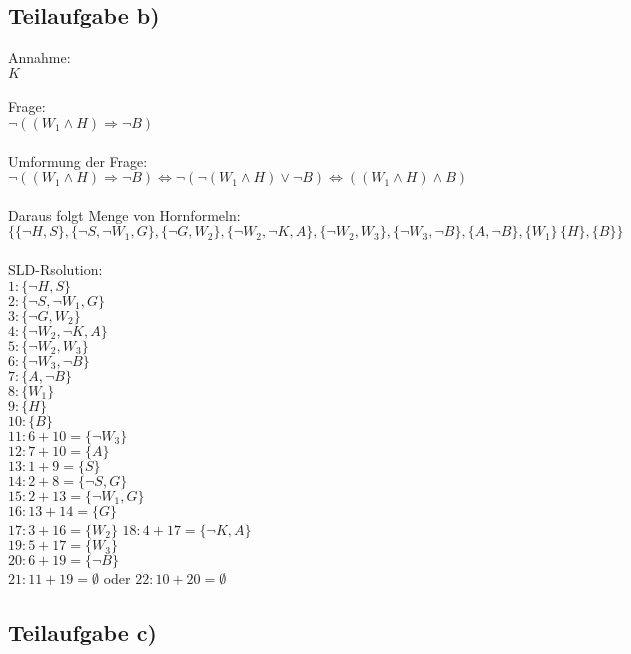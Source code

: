 \documentclass{article}
\begin{document}
\newpage

\subsection{Teilaufgabe b)}

Annahme:\\
$K$\\
\\
Frage:\\
$\neg ((W_1 \wedge H) \Rightarrow \neg B)$\\
\\
Umformung der Frage:\\
$\neg ((W_1 \wedge H) \Rightarrow \neg B) \Leftrightarrow \neg ( \neg (W_1 \wedge H) \vee \neg B) \Leftrightarrow ((W_1 \wedge H) \wedge B)$\\
\\
Daraus folgt Menge von Hornformeln:\\
$\{ \{\neg H,S\}, \{\neg S,\neg W_1,G\}, \{\neg G,W_2\}, \{\neg W_2,\neg K,A\}, \{\neg W_2,W_3\}, \{\neg W_3,\neg B\}, \{A,\neg B\}, \{W_1\}\, \{H\}, \{B\}\}$\\
\\
SLD-Rsolution:\\
$1: \{\neg H,S\}$\\
$2: \{\neg S,\neg W_1,G\}$\\
$3: \{\neg G,W_2\}$\\
$4: \{\neg W_2,\neg K,A\}$\\
$5: \{\neg W_2,W_3\}$\\
$6: \{\neg W_3,\neg B\}$\\
$7: \{A,\neg B\}$\\
$8: \{W_1\}$\\
$9: \{H\}$\\
$10: \{B\}$\\
$11: 6+10 = \{ \neg W_3 \}$\\
$12: 7+10 = \{A \}$\\
$13: 1+9 = \{ S \}$\\
$14: 2+8 = \{ \neg S, G \}$\\
$15: 2+13 = \{ \neg W_1,G \}$\\
$16: 13+14 = \{G \}$\\
$17: 3+16 = \{ W_2 \}$
$18: 4+17 = \{ \neg K, A \}$\\
$19: 5+17 = \{ W_3 \}$\\
$20: 6+19 = \{ \neg B \}$\\
$21: 11+19 = \emptyset$ oder $22: 10+20 = \emptyset$

\subsection{Teilaufgabe c)}
\end{document}
